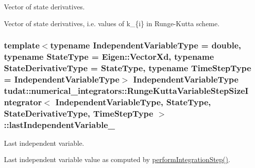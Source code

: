 Vector of state derivatives. 

Vector of state derivatives, i.\+e. values of k\+\_\+\{i\} in Runge-\/\+Kutta scheme. 
\subsubsection[{\texorpdfstring{last\+Independent\+Variable\+\_\+}{lastIndependentVariable_}}]{\setlength{\rightskip}{0pt plus 5cm}template$<$typename Independent\+Variable\+Type  = double, typename State\+Type  = Eigen\+::\+Vector\+Xd, typename State\+Derivative\+Type  = State\+Type, typename Time\+Step\+Type  = Independent\+Variable\+Type$>$ Independent\+Variable\+Type {\bf tudat\+::numerical\+\_\+integrators\+::\+Runge\+Kutta\+Variable\+Step\+Size\+Integrator}$<$ Independent\+Variable\+Type, State\+Type, State\+Derivative\+Type, Time\+Step\+Type $>$\+::last\+Independent\+Variable\+\_\+\hspace{0.3cm}{\ttfamily [protected]}}\hypertarget{classtudat_1_1numerical__integrators_1_1RungeKuttaVariableStepSizeIntegrator_a338e09348505c5e33dd5fa3ab4903d43}{}\label{classtudat_1_1numerical__integrators_1_1RungeKuttaVariableStepSizeIntegrator_a338e09348505c5e33dd5fa3ab4903d43}


Last independent variable. 

Last independent variable value as computed by \hyperlink{classtudat_1_1numerical__integrators_1_1RungeKuttaVariableStepSizeIntegrator_a34e884253297c9bfb17d756c36510cc4}{perform\+Integration\+Step()}. 
